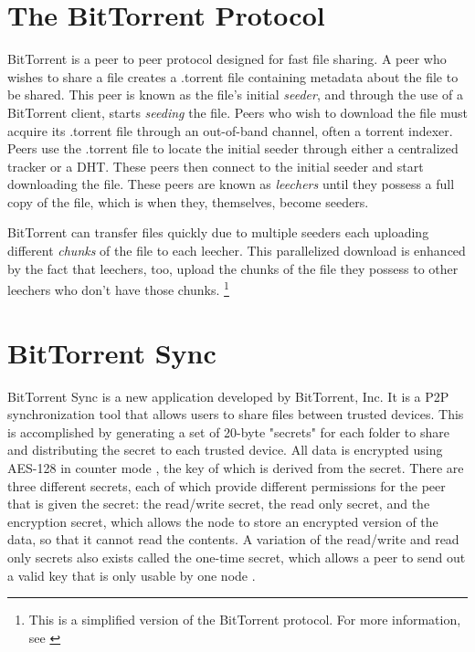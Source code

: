 \documentclass[12pt]{report}
\begin{document}


\section{The BitTorrent Protocol}

BitTorrent is a peer to peer protocol designed for fast file sharing. A peer who wishes to share a file creates a .torrent file containing metadata about the file to be shared. This peer is known as the file's initial \textit{seeder}, and through the use of a BitTorrent client, starts \textit{seeding} the file. Peers who wish to download the file must acquire its .torrent file through an out-of-band channel, often a torrent indexer. Peers use the .torrent file to locate the initial seeder through either a centralized tracker or a DHT. These peers then connect to the initial seeder and start downloading the file. These peers are known as \textit{leechers} until they possess a full copy of the file, which is when they, themselves, become seeders.

BitTorrent can transfer files quickly due to multiple seeders each uploading different \textit{chunks} of the file to each leecher. This parallelized download is enhanced by the fact that leechers, too, upload the chunks of the file they possess to other leechers who don't have those chunks. \footnote {This is a simplified version of the BitTorrent protocol. For more information, see \cite{bittorrentProtocol}}

\section{BitTorrent Sync}
BitTorrent Sync is a new application developed by BitTorrent, Inc. It is a P2P synchronization tool that allows users to share files between trusted devices. This is accomplished by generating a set of 20-byte "secrets" for each folder to share and distributing the secret to each trusted device. All data is encrypted using AES-128 in counter mode \cite{btsynctech}, the key of which is derived from the secret. There are three different secrets, each of which provide different permissions for the peer that is given the secret: the read/write secret, the read only secret, and the encryption secret, which allows the node to store an encrypted version of the data, so that it cannot read the contents. A variation of the read/write and read only secrets also exists called the one-time secret, which allows a peer to send out a valid key that is only usable by one node \cite{btsyncuserguide}.
\end{document}
